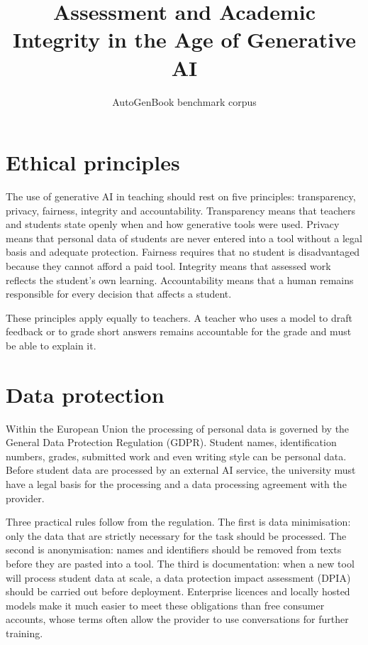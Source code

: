 \documentclass[11pt,a4paper]{article}
\title{Assessment and Academic Integrity in the Age of Generative AI}
\author{AutoGenBook benchmark corpus}
\date{}
\begin{document}
\maketitle
\thispagestyle{fancy}

\section{Ethical principles}

The use of generative AI in teaching should rest on five principles:
transparency, privacy, fairness, integrity and accountability. Transparency
means that teachers and students state openly when and how generative tools
were used. Privacy means that personal data of students are never entered
into a tool without a legal basis and adequate protection. Fairness requires
that no student is disadvantaged because they cannot afford a paid tool.
Integrity means that assessed work reflects the student's own learning.
Accountability means that a human remains responsible for every decision
that affects a student.

These principles apply equally to teachers. A teacher who uses a model to
draft feedback or to grade short answers remains accountable for the grade
and must be able to explain it.

\section{Data protection}

Within the European Union the processing of personal data is governed by the
General Data Protection Regulation (GDPR). Student names, identification
numbers, grades, submitted work and even writing style can be personal data.
Before student data are processed by an external AI service, the university
must have a legal basis for the processing and a data processing agreement
with the provider.

Three practical rules follow from the regulation. The first is data
minimisation: only the data that are strictly necessary for the task should
be processed. The second is anonymisation: names and identifiers should be
removed from texts before they are pasted into a tool. The third is
documentation: when a new tool will process student data at scale, a data
protection impact assessment (DPIA) should be carried out before deployment.
Enterprise licences and locally hosted models make it much easier to meet
these obligations than free consumer accounts, whose terms often allow the
provider to use conversations for further training.
\end{document}
